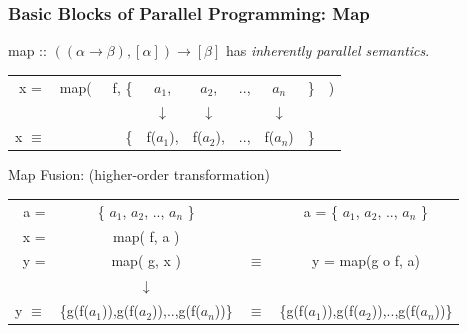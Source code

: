 \documentclass{beamer}
\renewcommand{\emph}[1]{\textcolor{structure}{#1}}
\newcommand{\emp}[1]{\textcolor{DikuRed}{ #1}}
\begin{document}
\begin{frame}[fragile,t]
   \frametitle{Basic Blocks of Parallel Programming: Map}

\bigskip

\emp{map} :: $((\alpha \rightarrow \beta), [\alpha]) \rightarrow [\beta] $ has \emph{\em inherently parallel semantics}.


\bigskip

\begin{tabular}{crcccccl}
x = & \emp{map}(~~~f, \{& $a_1$, & $a_2$, & .., & $a_n$ & \} & )\\
    &      & $\downarrow$ & $\downarrow$ &  & $\downarrow$ & &\\
x $\equiv$ &  \{  & \emph{f($a_1$)}, & \emph{f($a_2$)}, & .., & \emph{f($a_n$)} & \} &
\end{tabular}

\bigskip
\bigskip

\emp{Map Fusion:} (higher-order transformation)

\begin{tabular}{rccc}
a = & \{ $a_1$, $a_2$, .., $a_n$ \} & & a = \{ $a_1$, $a_2$, .., $a_n$ \} \\  
\emp{x =} & \emp{map( f, a )} & & \\
\emph{y} = & \emp{map( g, x )} & $\equiv$ & \emph{y} = \emp{map(g o f, a)}\\
  & $\downarrow$ & & \\
\emph{y} $\equiv$ &  \{\emph{g(f($a_1$))},\emph{g(f($a_2$))},..,\emph{g(f($a_n$))}\} & $\equiv$ & \{\emph{g(f($a_1$))},\emph{g(f($a_2$))},..,\emph{g(f($a_n$))}\} \\
\end{tabular}

\end{frame}
\end{document}
